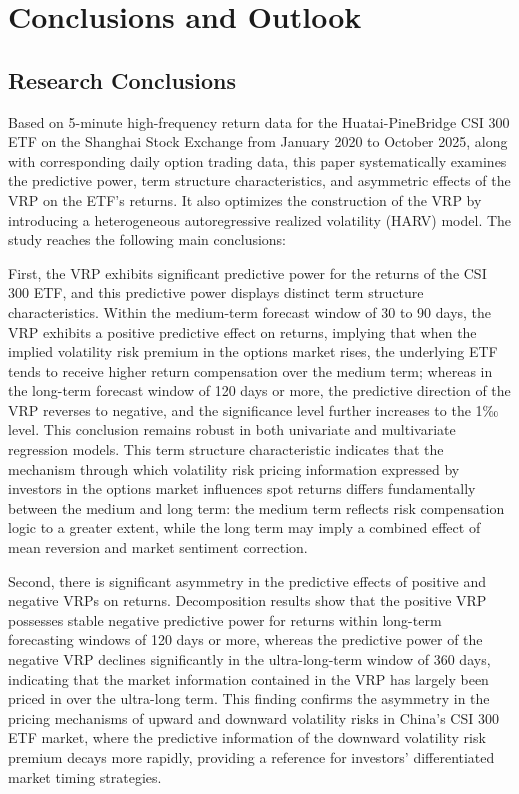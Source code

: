 \documentclass[a4paper, 12pt]{article}    %
\begin{document}
\section{Conclusions and Outlook}
\subsection{Research Conclusions}
Based on 5-minute high-frequency return data for the Huatai-PineBridge CSI 300 ETF on the Shanghai Stock Exchange from January 2020 to October 2025, along with corresponding daily option trading data, this paper systematically examines the predictive power, term structure characteristics, and asymmetric effects of the VRP on the ETF’s returns. It also optimizes the construction of the VRP by introducing a heterogeneous autoregressive realized volatility (HARV) model. The study reaches the following main conclusions:

First, the VRP exhibits significant predictive power for the returns of the CSI 300 ETF, and this predictive power displays distinct term structure characteristics. Within the medium-term forecast window of 30 to 90 days, the VRP exhibits a positive predictive effect on returns, implying that when the implied volatility risk premium in the options market rises, the underlying ETF tends to receive higher return compensation over the medium term; whereas in the long-term forecast window of 120 days or more, the predictive direction of the VRP reverses to negative, and the significance level further increases to the 1‰ level. This conclusion remains robust in both univariate and multivariate regression models. This term structure characteristic indicates that the mechanism through which volatility risk pricing information expressed by investors in the options market influences spot returns differs fundamentally between the medium and long term: the medium term reflects risk compensation logic to a greater extent, while the long term may imply a combined effect of mean reversion and market sentiment correction.

Second, there is significant asymmetry in the predictive effects of positive and negative VRPs on returns. Decomposition results show that the positive VRP possesses stable negative predictive power for returns within long-term forecasting windows of 120 days or more, whereas the predictive power of the negative VRP declines significantly in the ultra-long-term window of 360 days, indicating that the market information contained in the VRP has largely been priced in over the ultra-long term. This finding confirms the asymmetry in the pricing mechanisms of upward and downward volatility risks in China’s CSI 300 ETF market, where the predictive information of the downward volatility risk premium decays more rapidly, providing a reference for investors’ differentiated market timing strategies.
\end{document}
